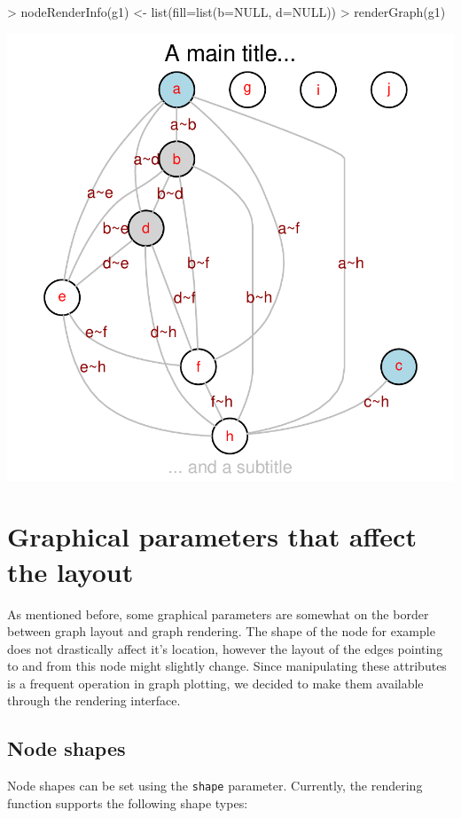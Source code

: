 \documentclass{article}
\newcommand{\Robject}[1]{{\texttt{#1}}}
\begin{document}
\begin{Schunk}
\begin{Sinput}
> nodeRenderInfo(g1) <- list(fill=list(b=NULL, d=NULL))
> renderGraph(g1)
\end{Sinput}
\end{Schunk}
\includegraphics{newRgraphvizInterface-reset}


\section{Graphical parameters that affect the layout}\label{layoutpars}
As mentioned before, some graphical parameters are somewhat on the
border between graph layout and graph rendering. The shape of the node
for example does not drastically affect it's location, however the
layout of the edges pointing to and from this node might slightly
change. Since manipulating these attributes is a frequent operation in
graph plotting, we decided to make them available through the
rendering interface.

\subsection{Node shapes}
Node shapes can be set using the \Robject{shape} parameter. Currently,
the rendering function supports the following shape types:
\end{document}
